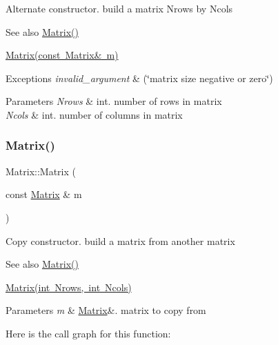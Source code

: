 Alternate constructor. build a matrix Nrows by Ncols \begin{DoxySeeAlso}{See also}
\mbox{\hyperlink{class_matrix_a2dba13c45127354c9f75ef576f49269b}{Matrix()}} 

\mbox{\hyperlink{class_matrix_a765f4dcb51b6829311cc3e7576388423}{Matrix(const Matrix\& m)}} 
\end{DoxySeeAlso}

\begin{DoxyExceptions}{Exceptions}
{\em invalid\+\_\+argument} & (\char`\"{}matrix size negative or zero\char`\"{}) \\
\hline
\end{DoxyExceptions}

\begin{DoxyParams}{Parameters}
{\em Nrows} & int. number of rows in matrix \\
\hline
{\em Ncols} & int. number of columns in matrix \\
\hline
\end{DoxyParams}
\mbox{\label{class_matrix_a765f4dcb51b6829311cc3e7576388423}} 
\subsubsection{\texorpdfstring{Matrix()}{Matrix()}\hspace{0.1cm}{\footnotesize\ttfamily [3/3]}}
{\footnotesize\ttfamily Matrix\+::\+Matrix (\begin{DoxyParamCaption}\item[{const \mbox{\hyperlink{class_matrix}{Matrix}} \&}]{m }\end{DoxyParamCaption})}

Copy constructor. build a matrix from another matrix \begin{DoxySeeAlso}{See also}
\mbox{\hyperlink{class_matrix_a2dba13c45127354c9f75ef576f49269b}{Matrix()}} 

\mbox{\hyperlink{class_matrix_a135a15de1126d735bb95fcc839d739d7}{Matrix(int Nrows, int Ncols)}} 
\end{DoxySeeAlso}

\begin{DoxyParams}{Parameters}
{\em m} & \mbox{\hyperlink{class_matrix}{Matrix}}\&. matrix to copy from \\
\hline
\end{DoxyParams}
Here is the call graph for this function\+:



